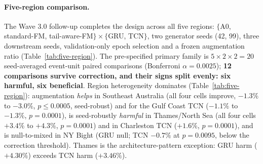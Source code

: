 \paragraph{Five-region comparison.} The Wave 3.0 follow-up completes the
design across all five regions: $\{$A0, standard-FM, tail-aware-FM$\} \times
\{$GRU, TCN$\}$, two generator seeds (42, 99), three downstream seeds,
validation-only epoch selection and a frozen augmentation ratio
(Table~\ref{tab:five-region}). The pre-specified primary family is
$5 \times 2 \times 2 = 20$ seed-averaged event-unit paired comparisons
(Bonferroni $\alpha = 0.0025$); \textbf{12 comparisons survive correction,
and their signs split evenly: six harmful, six beneficial}.
Region heterogeneity dominates (Table~\ref{tab:five-region}): augmentation
\emph{helps} in Southeast Australia (all four cells improve,
$-1.3\%$ to $-3.0\%$, $p \le 0.0005$, seed-robust) and for the Gulf Coast
TCN ($-1.1\%$ to $-1.3\%$, $p = 0.0001$), is seed-robustly \emph{harmful}
in Thames/North Sea (all four cells $+3.4\%$ to $+4.3\%$, $p=0.0001$) and
in Charleston TCN ($+1.6\%$, $p=0.0001$), and is null-to-mixed in NY Bight
(GRU null; TCN $-0.7\%$ at $p=0.0095$, below the correction threshold).
Thames is the architecture-pattern exception: GRU harm ($+4.30\%$) exceeds
TCN harm ($+3.46\%$).

